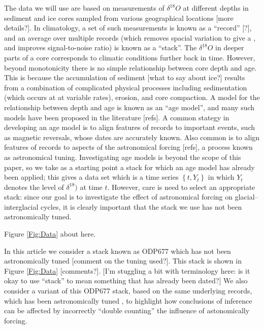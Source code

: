 \documentclass[a4paper,12pt]{article}
\begin{document}
The data we will use are based on measurements of $\delta^{18}O$ at different depths in sediment
and ice cores sampled from various geographical locations [more details?].  In
climatology, a set of such measurements is known as a ``record'' [?], and an average
over multiple records (which removes spacial variation to give a , and improves
signal-to-noise ratio) is known as a ``stack''.  The $\delta^{18}O$ in deeper parts of a
core corresponds to climatic conditions further back in time.  However, beyond monotonicity
there is no simple relationship between core depth and age.  This is because the
accumulation of sediment [what to say about ice?] results from a combination of 
complicated physical processes
including sedimentation (which occurs at at variable rates), erosion, and core
compaction.  A model for the relationship between depth and age is known as an ``age
model'', and many such models have been proposed in the literature [refs].  
A common stategy in developing an age
model is to align features of records to important events, such as magnetic reversals,
whose dates are accurately known.  Also common is to align features of records to aspects of the
astronomical forcing [refs], a process known as astronomical tuning.  Investigating age 
models is beyond the scope of this paper, so we take as a starting point a stack for which
an age model has already been applied; this gives a data set which is a time series 
$\left\{ t, Y_t\right\}$ in which $Y_t$ denotes the level of $\delta^{18})$ at time $t$.  
However, care is need to select an appropriate stack: since our goal is to investigate the 
effect of astronomical forcing on
glacial--interglacial cycles, it is clearly important that the stack we use has
not been astronomically tuned.

\begin{center}
\begin{LARGE}
Figure \ref{Fig:Data} about here.
\end{LARGE}
\end{center}


In this article we consider a stack known as ODP677 which has not been
astronomically tuned \cite{Huybers2007} [comment on the tuning used?].  
This stack is shown in Figure
\ref{Fig:Data} [comments?].  [I'm stuggling a bit with terminology here: is it okay to
use ``stack'' to mean something that has already been dated?]  We also consider a
variant of this ODP677 stack, based on the same underlying records, which has been 
astronomically
tuned \cite{Lisiecki2005}, to highlight how conclusions of inference can be affected by
incorrectly ``double counting'' the influence of astonomically forcing.
\end{document}
